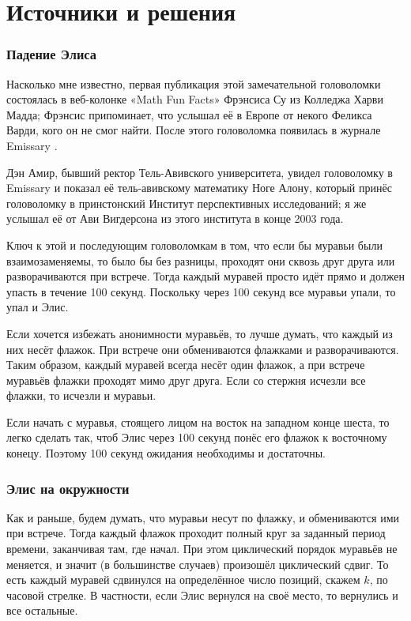 \section*{Источники и решения}

\subsubsection*{Падение Элиса}

Насколько мне известно, первая публикация этой замечательной головоломки состоялась в веб-колонке «Math Fun Facts» Фрэнсиса Су из Колледжа Харви Мадда;
Фрэнсис припоминает, что услышал её в Европе от некого Феликса Варди, кого он не смог найти.
После этого головоломка появилась в журнале Emissary \cite[Весна/Осень 2003]{berlekamp-buhle}.

Дэн Амир, бывший ректор Тель-Авивского университета, увидел головоломку в Emissary и показал её тель-авивскому математику Ноге Алону, который принёс головоломку в принстонский Институт перспективных исследований;
я же услышал её от Ави Вигдерсона из этого института в конце 2003 года.

Ключ к этой и последующим головоломкам в том, что если бы муравьи были взаимозаменяемы, то было бы без разницы, проходят они сквозь друг друга или разворачиваются при встрече.
Тогда каждый муравей просто идёт прямо и должен упасть в течение 100 секунд.
Поскольку через 100 секунд все муравьи упали, то упал и Элис.

Если хочется избежать анонимности муравьёв, то лучше думать, что каждый из них несёт флажок.
При встрече они обмениваются флажками и разворачиваются.
Таким образом, каждый муравей всегда несёт один флажок, а при встрече муравьёв флажки проходят мимо друг друга.
Если со стержня исчезли все флажки, то исчезли и муравьи.

Если начать с муравья, стоящего лицом на восток на западном конце шеста, то легко сделать так, чтоб Элис через 100 секунд понёс его флажок к восточному конецу.
Поэтому 100 секунд ожидания необходимы и достаточны.

\subsubsection*{Элис на окружности}

Как и раньше, будем думать, что муравьи несут по флажку, и обмениваются ими при встрече.
Тогда каждый флажок проходит полный круг за заданный период времени, заканчивая там, где начал.
При этом циклический порядок муравьёв не меняется, и значит (в большинстве случаев) произошёл циклический сдвиг.
То есть каждый муравей сдвинулся на определённое число позиций, скажем $k$, по часовой стрелке.
В частности, если Элис вернулся на своё место, то вернулись и все остальные.

